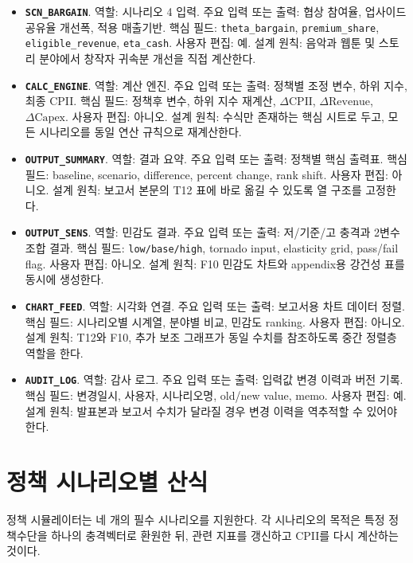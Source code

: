 \documentclass[11pt,a4paper]{report}
\newenvironment{summarylist}{\begin{itemize}[leftmargin=1.8em,itemsep=0.35em,topsep=0.35em]\RaggedRight}{\end{itemize}}
\begin{document}
\begin{summarylist}
  \item \textbf{\texttt{SCN\_BARGAIN}}. 역할: 시나리오 4 입력. 주요 입력 또는 출력: 협상 참여율, 업사이드 공유율 개선폭, 적용 매출기반. 핵심 필드: \texttt{theta\_bargain}, \texttt{premium\_share}, \texttt{eligible\_revenue}, \texttt{eta\_cash}. 사용자 편집: 예. 설계 원칙: 음악과 웹툰 및 스토리 분야에서 창작자 귀속분 개선을 직접 계산한다.
  \item \textbf{\texttt{CALC\_ENGINE}}. 역할: 계산 엔진. 주요 입력 또는 출력: 정책별 조정 변수, 하위 지수, 최종 CPII. 핵심 필드: 정책후 변수, 하위 지수 재계산, $\Delta \mathrm{CPII}$, $\Delta \mathrm{Revenue}$, $\Delta \mathrm{Capex}$. 사용자 편집: 아니오. 설계 원칙: 수식만 존재하는 핵심 시트로 두고, 모든 시나리오를 동일 연산 규칙으로 재계산한다.
  \item \textbf{\texttt{OUTPUT\_SUMMARY}}. 역할: 결과 요약. 주요 입력 또는 출력: 정책별 핵심 출력표. 핵심 필드: baseline, scenario, difference, percent change, rank shift. 사용자 편집: 아니오. 설계 원칙: 보고서 본문의 T12 표에 바로 옮길 수 있도록 열 구조를 고정한다.
  \item \textbf{\texttt{OUTPUT\_SENS}}. 역할: 민감도 결과. 주요 입력 또는 출력: 저/기준/고 충격과 2변수 조합 결과. 핵심 필드: \texttt{low/base/high}, tornado input, elasticity grid, pass/fail flag. 사용자 편집: 아니오. 설계 원칙: F10 민감도 차트와 appendix용 강건성 표를 동시에 생성한다.
  \item \textbf{\texttt{CHART\_FEED}}. 역할: 시각화 연결. 주요 입력 또는 출력: 보고서용 차트 데이터 정렬. 핵심 필드: 시나리오별 시계열, 분야별 비교, 민감도 ranking. 사용자 편집: 아니오. 설계 원칙: T12와 F10, 추가 보조 그래프가 동일 수치를 참조하도록 중간 정렬층 역할을 한다.
  \item \textbf{\texttt{AUDIT\_LOG}}. 역할: 감사 로그. 주요 입력 또는 출력: 입력값 변경 이력과 버전 기록. 핵심 필드: 변경일시, 사용자, 시나리오명, old/new value, memo. 사용자 편집: 예. 설계 원칙: 발표본과 보고서 수치가 달라질 경우 변경 이력을 역추적할 수 있어야 한다.
\end{summarylist}
\endgroup

\section{정책 시나리오별 산식}
정책 시뮬레이터는 네 개의 필수 시나리오를 지원한다. 각 시나리오의 목적은 특정 정책수단을 하나의 충격벡터로 환원한 뒤, 관련 지표를 갱신하고 CPII를 다시 계산하는 것이다.
\end{document}
